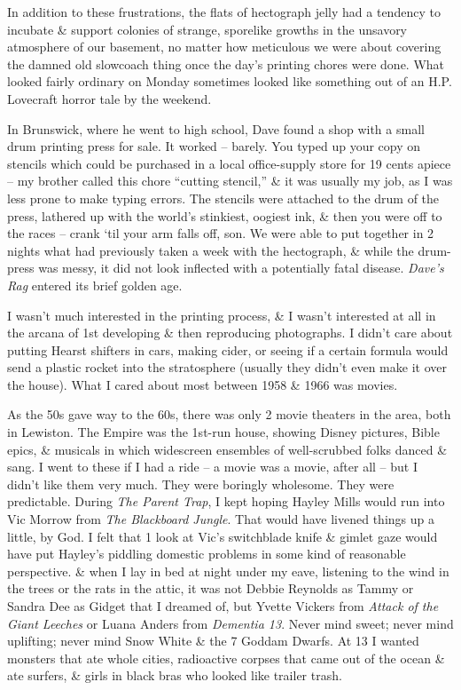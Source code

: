 \documentclass{article}
\numberwithin{equation}{section}
\begin{document}
In addition to these frustrations, the flats of hectograph jelly had a tendency to incubate \& support colonies of strange, sporelike growths in the unsavory atmosphere of our basement, no matter how meticulous we were about covering the damned old slowcoach thing once the day's printing chores were done. What looked fairly ordinary on Monday sometimes looked like something out of an H.P. Lovecraft horror tale by the weekend.

In Brunswick, where he went to high school, Dave found a shop with a small drum printing press for sale. It worked -- barely. You typed up your copy on stencils which could be purchased in a local office-supply store for 19 cents apiece -- my brother called this chore ``cutting stencil,'' \& it was usually my job, as I was less prone to make typing errors. The stencils were attached to the drum of the press, lathered up with the world's stinkiest, oogiest ink, \& then you were off to the races -- crank `til your arm falls off, son. We were able to put together in 2 nights what had previously taken a week with the hectograph, \& while the drum-press was messy, it did not look inflected with a potentially fatal disease. \textit{Dave's Rag} entered its brief golden age.

 I wasn't much interested in the printing process, \& I wasn't interested at all in the arcana of 1st developing \& then reproducing photographs. I didn't care about putting Hearst shifters in cars, making cider, or seeing if a certain formula would send a plastic rocket into the stratosphere (usually they didn't even make it over the house). What I cared about most between 1958 \& 1966 was movies.

As the 50s gave way to the 60s, there was only 2 movie theaters in the area, both in Lewiston. The Empire was the 1st-run house, showing Disney pictures, Bible epics, \& musicals in which widescreen ensembles of well-scrubbed folks danced \& sang. I went to these if I had a ride -- a movie was a movie, after all -- but I didn't like them very much. They were boringly wholesome. They were predictable. During \textit{The Parent Trap}, I kept hoping Hayley Mills would run into Vic Morrow from \textit{The Blackboard Jungle}. That would have livened things up a little, by God. I felt that 1 look at Vic's switchblade knife \& gimlet gaze would have put Hayley's piddling domestic problems in some kind of reasonable perspective. \& when I lay in bed at night under my eave, listening to the wind in the trees or the rats in the attic, it was not Debbie Reynolds as Tammy or Sandra Dee as Gidget that I dreamed of, but Yvette Vickers from \textit{Attack of the Giant Leeches} or Luana Anders from \textit{Dementia 13}. Never mind sweet; never mind uplifting; never mind Snow White \& the 7 Goddam Dwarfs. At 13 I wanted monsters that ate whole cities, radioactive corpses that came out of the ocean \& ate surfers, \& girls in black bras who looked like trailer trash.
\end{document}
